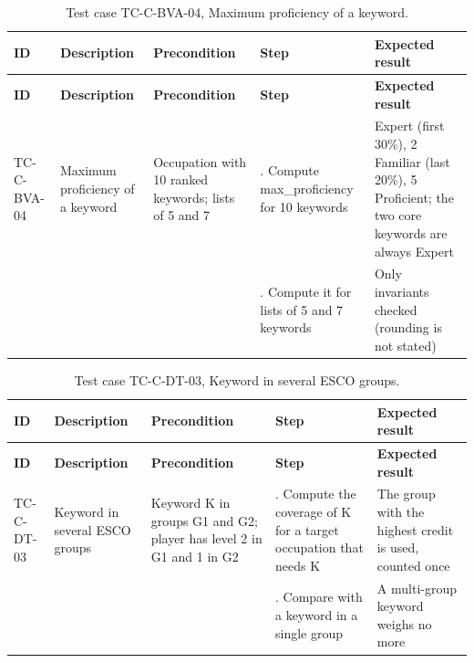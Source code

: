 {\small
\begin{longtable}{|>{\raggedright\arraybackslash}p{}|>{\raggedright\arraybackslash}p{}|>{\raggedright\arraybackslash}p{}|>{\raggedright\arraybackslash}p{}|>{\raggedright\arraybackslash}p{}|}
\caption{Test case TC-C-BVA-04, Maximum proficiency of a keyword.} \\
\hline
\textbf{ID} & \textbf{Description} & \textbf{Precondition} & \textbf{Step} & \textbf{Expected result} \\ \hline
\endfirsthead
\hline
\textbf{ID} & \textbf{Description} & \textbf{Precondition} & \textbf{Step} & \textbf{Expected result} \\ \hline
\endhead
TC-C-BVA-04 & Maximum proficiency of a keyword & Occupation with 10 ranked keywords; lists of 5 and 7 & 1. Compute max\_proficiency for 10 keywords & 3 Expert (first 30\%), 2 Familiar (last 20\%), 5 Proficient; the two core keywords are always Expert \\ \hline
 &  &  & 2. Compute it for lists of 5 and 7 keywords & Only invariants checked (rounding is not stated) \\ \hline
\end{longtable}
}

{\small
\begin{longtable}{|>{\raggedright\arraybackslash}p{}|>{\raggedright\arraybackslash}p{}|>{\raggedright\arraybackslash}p{}|>{\raggedright\arraybackslash}p{}|>{\raggedright\arraybackslash}p{}|}
\caption{Test case TC-C-DT-03, Keyword in several ESCO groups.} \\
\hline
\textbf{ID} & \textbf{Description} & \textbf{Precondition} & \textbf{Step} & \textbf{Expected result} \\ \hline
\endfirsthead
\hline
\textbf{ID} & \textbf{Description} & \textbf{Precondition} & \textbf{Step} & \textbf{Expected result} \\ \hline
\endhead
TC-C-DT-03 & Keyword in several ESCO groups & Keyword K in groups G1 and G2; player has level 2 in G1 and 1 in G2 & 1. Compute the coverage of K for a target occupation that needs K & The group with the highest credit is used, counted once \\ \hline
 &  &  & 2. Compare with a keyword in a single group & A multi-group keyword weighs no more \\ \hline
\end{longtable}
}

